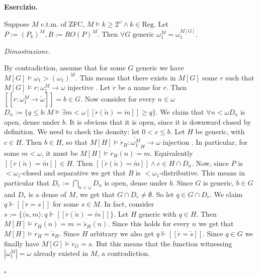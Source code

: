 \documentclass[a4paper,12pt]{article}
\newenvironment{exercise}
  {\par\vspace{1em}\noindent\textbf{Esercizio.} }
  {\par\vspace{1em}}
\newenvironment{proof}
  {\par\vspace{0.5em}\noindent\textit{Dimostrazione.} }
  {\par\vspace{1em}\hfill$\square$}
\begin{document}
\begin{exercise}
	
	Suppose $M$ c.t.m. of ZFC, $M \models k \geq 2^{\omega} \land k \in  \text{Reg}$. Let $P := (P_k)^M, B := RO(P)^M$. Then $ \forall G \text{ generic } \omega_1 ^M = \omega_1 ^{M[G]}$.
	
\end{exercise}

\begin{proof}

	By contradiction, assume that for some $G$ generic we have $M[G] \models \omega_1 > (\omega_1)^M$. This means that there exists in $M[G]$ some $r$ such that $M[G] \models r: \omega_1 ^M \to \omega \text{ injective }$.
	Let $\dot{r}$ be a name for $r$. Then $[[ \dot{r}: \check{\omega_1 ^M} \to \check{\omega} ]] = b \in G$. 
	Now consider for every $n \in \omega$ $D_n := \{ q \leq b : M \models \exists m<\omega [[ \dot{r}(\check{n}) = \check{m} ]] \geq q \}$.
	We claim that $\forall n<\omega D_n$ is open, dense under $b$. It is obvious that it is open, since it is downward closed by definition.
	We need to check the density: let $0 < c \leq b$. Let $H$ be generic, with $c \in H$. Then $b \in H$, so that $M[H] \models \dot{r}_H : \check{\omega_1 ^M}_H \to \omega \text{ injection }$.
	In particular, for some $m < \omega$, it must be $M[H] \models \dot{r}_H (n) = m$. Equivalently $[[ \dot{r} (\check{n}) = \check{m} ]] \in H$. Then $[[ \dot{r} (\check{n}) = \check{m} ]] \wedge c \in H \cap D_n $.
	Now, since $P$ is $<\omega_1$-closed and separative we get that $B$ is $<\omega_1$-distributive. This means in particular that $D_{\dot{r}} := \bigcap_{n<\omega} D_n$ is open, dense under $b$.
	Since $G$ is generic, $b \in G$ and $D_{\dot{r}}$ is a dense of $M$, we get that $G \cap D_{\dot{r}} \not = \emptyset $.
	So let $q \in G \cap D_{\dot{r}}$. We claim $q \Vdash [[ \dot{r} = s ]]$ for some $s \in M$. 
	In fact, consider $ s := \{ \langle n,m \rangle : q \Vdash [[ \dot{r}(\check{n}) = \check{m}]]\}$.
	Let $H$ generic with $q \in H$. Then $M[H] \models \dot{r}_H (n) = m = \check{s}_H (n)$. Since this holds for every $n$ we get that $M[H] \models \dot{r}_H = \check{s}_H$. 
	Since $H$ arbitrary we also get $q \Vdash [[ \dot{r} = \check{s} ]]$. Since $q \in G$ we finally have $M[G] \models \dot{r}_G = s$. But this means that the function witnessing $|\omega_1 ^M| = \omega $ already existed in $M$, a contradiction. 

\end{proof}
\end{document}
